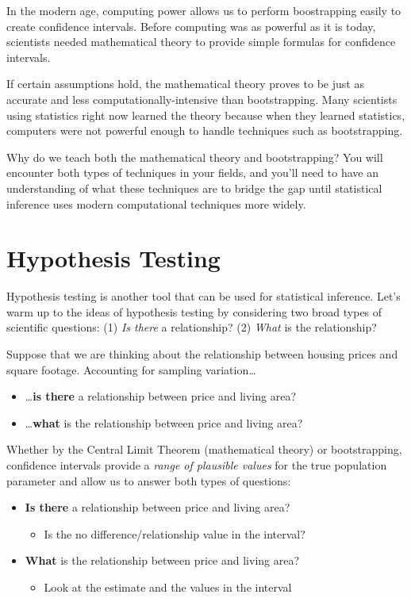 \documentclass[]{book}
\providecommand{\tightlist}{%
  \setlength{\itemsep}{0pt}\setlength{\parskip}{0pt}}
\begin{document}
In the modern age, computing power allows us to perform boostrapping easily to create confidence intervals. Before computing was as powerful as it is today, scientists needed mathematical theory to provide simple formulas for confidence intervals.

If certain assumptions hold, the mathematical theory proves to be just as accurate and less computationally-intensive than bootstrapping. Many scientists using statistics right now learned the theory because when they learned statistics, computers were not powerful enough to handle techniques such as bootstrapping.

Why do we teach both the mathematical theory and bootstrapping? You will encounter both types of techniques in your fields, and you'll need to have an understanding of what these techniques are to bridge the gap until statistical inference uses modern computational techniques more widely.

\hypertarget{hypothesis-testing}{%
\section{Hypothesis Testing}\label{hypothesis-testing}}

Hypothesis testing is another tool that can be used for statistical inference. Let's warm up to the ideas of hypothesis testing by considering two broad types of scientific questions: (1) \emph{Is there} a relationship? (2) \emph{What} is the relationship?

Suppose that we are thinking about the relationship between housing prices and square footage. Accounting for sampling variation\ldots{}

\begin{itemize}
\tightlist
\item
  \ldots{}\textbf{is there} a relationship between price and living area?
\item
  \ldots{}\textbf{what} is the relationship between price and living area?
\end{itemize}

Whether by the Central Limit Theorem (mathematical theory) or bootstrapping, confidence intervals provide a \emph{range of plausible values} for the true population parameter and allow us to answer both types of questions:

\begin{itemize}
\tightlist
\item
  \textbf{Is there} a relationship between price and living area?

  \begin{itemize}
  \tightlist
  \item
    Is the no difference/relationship value in the interval?
  \end{itemize}
\item
  \textbf{What} is the relationship between price and living area?

  \begin{itemize}
  \tightlist
  \item
    Look at the estimate and the values in the interval
  \end{itemize}
\end{itemize}
\end{document}
